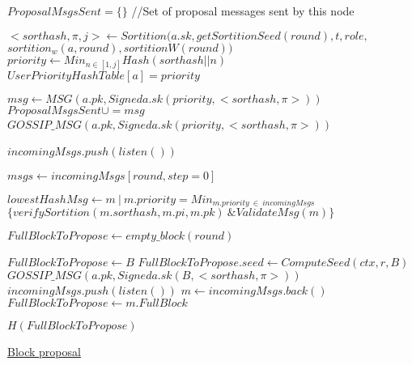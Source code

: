 \documentclass[10pt,a4paper]{article}
\begin{document}
\begin{algorithm}
    \begin{algorithmic}[H]
        \State $ProposalMsgsSent = \{\}$ //Set of proposal messages sent by this node

            \State $<sorthash, \pi, j>\gets Sortition(a.sk, getSortitionSeed(round), t, role, $ \newline
            $sortition_w(a, round), sortitionW(round))$
                \State $priority \gets Min_{n \in [1,j]}{Hash(sorthash || n)}$
                \State $UserPriorityHashTable[a] = priority$

                \State $msg \gets MSG(a.pk, Signed{a.sk}(priority, <sorthash, \pi>))$
                \State $ProposalMsgsSent \cup= msg$
                \State $GOSSIP\_MSG(a.pk, Signed{a.sk}(priority, <sorthash, \pi>))$
            \EndIf
        \EndFor\


            \State $incomingMsgs.push(listen())$
        \EndWhile\

        \State $msgs \gets incomingMsgs[round, step=0]$


        \State $lowestHashMsg \gets m\ |\ m.priority = Min_{m.priority\ \in\ incomingMsgs}$ \newline
        ${\{verifySortition(m.sorthash, m.pi, m.pk)\ \& ValidateMsg(m)\}}$

        \State $FullBlockToPropose \gets empty\_block(round)$

            \State $FullBlockToPropose \gets B$
            \State $FullBlockToPropose.seed \gets ComputeSeed(ctx, r, B)$
            \State $GOSSIP\_MSG(a.pk, Signed{a.sk}(B, <sorthash, \pi>))$
        \Else
        {
                \State $incomingMsgs.push(listen())$
                \State $m \gets incomingMsgs.back()$
                    \State $FullBlockToPropose \gets m.FullBlock$
                \EndIf
            \EndWhile
        }
        \EndIf

        \Return $H(FullBlockToPropose)$

    \EndFunction
    \end{algorithmic}
    \caption{\underline{Block proposal}}
\end{algorithm}
\end{document}
